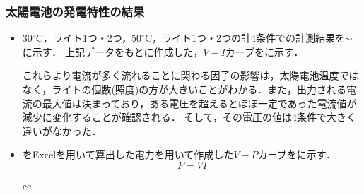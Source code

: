 \subsubsection{太陽電池の発電特性の結果}
\label{solar-cell-result}
\begin{itemize}
	\item $30^{\circ}$C，ライト1つ・2つ，$50^{\circ}$C，ライト1つ・2つの計4条件での計測結果を$\sim$に示す．
	上記データをもとに作成した，$V-I$カーブをに示す．
	
	これらより電流が多く流れることに関わる因子の影響は，太陽電池温度ではなく，ライトの個数(照度)の方が大きいことがわかる．また，出力される電流の最大値は決まっており，ある電圧を超えるとほぼ一定であった電流値が減少に変化することが確認される．
	そして，その電圧の値は4条件で大きく違いがなかった．
	\item {}をExcelを用いて算出した電力を用いて作成した$V-P$カーブをに示す．
	\begin{equation}
		P=VI
		\label{eq:power}
	\end{equation}
	\begin{table}[p]
	\begin{tabular}{cc}
	\begin{minipage}[t]{0.5\hsize}
	\centering
	\caption{$30^{\circ}$C　ライト1つの場合(照度8600\,\rm{lux})}
	\label{tab:30-one}
\end{minipage}
\end{tabular}
\end{table}
\end{itemize}
